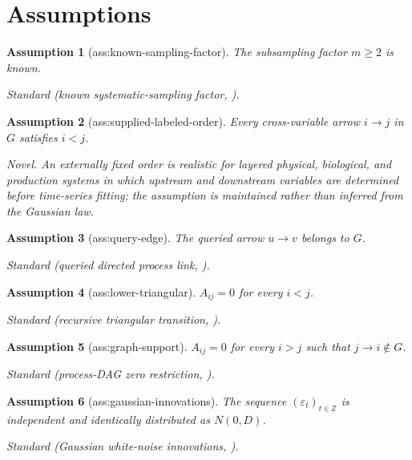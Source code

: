 \documentclass{article}
\newtheorem{assumption}{Assumption}
\begin{document}
\section{Assumptions}

\begin{assumption}[ass:known-sampling-factor]\label{ass:known-sampling-factor}
The subsampling factor \(m\ge2\) is known.
\par\smallskip\noindent\emph{Standard} (known systematic-sampling factor, \cite{gong2015discovering}).
\end{assumption}

\begin{assumption}[ass:supplied-labeled-order]\label{ass:supplied-labeled-order}
Every cross-variable arrow \(i\to j\) in \(G\) satisfies \(i<j\).
\par\smallskip\noindent\emph{Novel.} An externally fixed order is realistic for layered physical, biological, and production systems in which upstream and downstream variables are determined before time-series fitting; the assumption is maintained rather than inferred from the Gaussian law.
\end{assumption}

\begin{assumption}[ass:query-edge]\label{ass:query-edge}
The queried arrow \(u\to v\) belongs to \(G\).
\par\smallskip\noindent\emph{Standard} (queried directed process link, \cite{reiter2026processgraphs}).
\end{assumption}

\begin{assumption}[ass:lower-triangular]\label{ass:lower-triangular}
\(A_{ij}=0\) for every \(i<j\).
\par\smallskip\noindent\emph{Standard} (recursive triangular transition, \cite{smith2003schur}).
\end{assumption}

\begin{assumption}[ass:graph-support]\label{ass:graph-support}
\(A_{ij}=0\) for every \(i>j\) such that \(j\to i\notin G\).
\par\smallskip\noindent\emph{Standard} (process-DAG zero restriction, \cite{reiter2026processgraphs}).
\end{assumption}

\begin{assumption}[ass:gaussian-innovations]\label{ass:gaussian-innovations}
The sequence \((\varepsilon_t)_{t\in\mathbb Z}\) is independent and identically distributed as \(N(0,D)\).
\par\smallskip\noindent\emph{Standard} (Gaussian white-noise innovations, \cite{gong2015discovering}).
\end{assumption}
\end{document}
